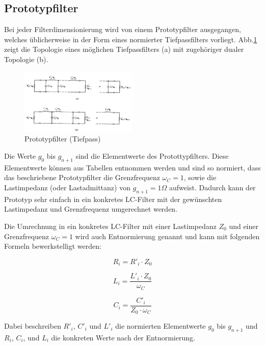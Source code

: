 \subsection{Prototypfilter}

Bei jeder Filterdimensionierung wird von einem Prototypfilter ausgegangen, welches üblicherweise in der Form eines normierter Tiefpassfilters vorliegt. Abb.\ref{fig:Prototyp_Filter} zeigt die Topologie eines möglichen Tiefpassfilters (a) mit zugehöriger dualer Topologie (b).

\begin{figure}[h!]
\centering
 	\includegraphics[width=0.5\textwidth]{Prototyp_Filter.png}
 	\caption{Prototypfilter (Tiefpass)}
 	\label{fig:Prototyp_Filter}
\end{figure}


Die Werte $g_0$ bis $g_{n+1}$ sind die Elementwerte des Protottypfilters. Diese Elementwerte können aus Tabellen entnommen werden und sind so normiert, dass das beschriebene  Prototypfilter die Grenzfrequenz $\omega_{C} = 1$, sowie die Lastimpedanz (oder Lastadmittanz) von $g_{n+1}=1\Omega$ aufweist. Dadurch kann der Prototyp sehr einfach in ein konkretes LC-Filter mit der gewünschten Lastimpedanz und Grenzfrequenz umgerechnet werden. 

Die Umrechnung in ein konkretes LC-Filter mit einer Lastimpedanz $Z_0$ und einer Grenzfrequenz $\omega_{C} = 1$ wird auch Entnormierung genannt und kann mit folgenden Formeln bewerkstelligt werden: 

\begin{equation}\label{eq:R}	
R_i = R'_i \cdot Z_0
\end{equation}

\begin{equation}\label{eq:L}	
L_i = \frac{L'_i \cdot Z_0}{\omega_{C}}
\end{equation}

\begin{equation}\label{eq:C}	
C_i = \frac{C'_i}{Z_0 \cdot \omega_{C}}
\end{equation}

Dabei beschreiben  $R'_i$, $C'_i$ und $L'_i$ die normierten Elementwerte  $g_0$ bis $g_{n+1}$ und $R_i$, $C_i$, und $L_i$ die konkreten Werte nach der Entnormierung.
